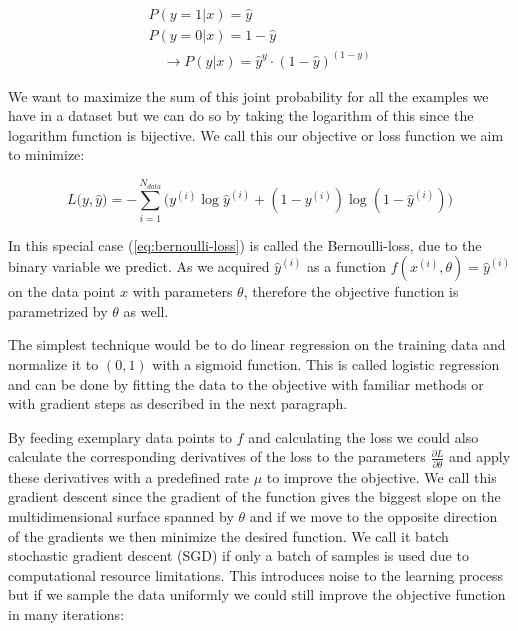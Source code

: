 \documentclass[a4paper,12pt]{article}
\begin{document}
\vspace{4mm}

\begin{align*}
    P(y = 1 | x) = \hat{y} \\
    P(y = 0 | x) = 1 - \hat{y} \\
    \quad \rightarrow P(y | x) = \hat{y}^{y} \cdot (1 - \hat{y})^{(1-y)}
\end{align*}

\vspace{4mm}

\par We want to maximize the sum of this joint probability for all the examples we have in a dataset but we can do so by taking the logarithm of this since the logarithm function is bijective. We call this our objective or loss function we aim to minimize:

\vspace{4mm}

\begin{equation}
    L\big(y, \hat{y}\big) = -\sum_{i = 1}^{N_{data}} \Big(y^{(i)}\log\hat{y}^{(i)} + (1 - y^{(i)})\log(1 - \hat{y}^{(i)})\Big)
    \label{eq:bernoulli-loss}
\end{equation}

\vspace{4mm}

\par In this special case (\ref{eq:bernoulli-loss}) is called the Bernoulli-loss, due to the binary variable we predict. As we acquired $\hat{y}^{(i)}$ as a function $f(x^{(i)}, \theta) = \hat{y}^{(i)}$ on the data point $x$ with parameters $\theta$, therefore the objective function is parametrized by $\theta$ as well. 

\vspace{4mm}

\par The simplest technique would be to do linear regression on the training data and normalize it to $(0, 1)$ with a sigmoid function. This is called logistic regression and can be done by fitting the data to the objective with familiar methods or with gradient steps as described in the next paragraph.

\vspace{4mm}

By feeding exemplary data points to $f$ and calculating the loss we could also calculate the corresponding derivatives of the loss to the parameters $\frac{\partial L}{\partial \theta}$ and apply these derivatives with a predefined rate $\mu$ to improve the objective. We call this gradient descent since the gradient of the function gives the biggest slope on the multidimensional surface spanned by $\theta$ and if we move to the opposite direction of the gradients we then minimize the desired function. We call it batch stochastic gradient descent (SGD) if only a batch of samples is used due to computational resource limitations. This introduces noise to the learning process but if we sample the data uniformly we could still improve the objective function in many iterations:
\end{document}
